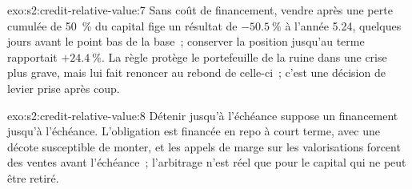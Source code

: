\begin{solution}{exo:s2:credit-relative-value:7}
Sans coût de financement, vendre après une perte cumulée de 50~\% du capital fige un résultat de $-50.5~\%$ à l'année 5.24, quelques jours avant le point bas de la base~; conserver la position jusqu'au terme
rapportait $+24.4~\%$. La règle protège le portefeuille de la ruine dans une crise plus grave, mais lui fait renoncer au rebond de celle-ci~; c'est une décision de levier prise après
coup.
\end{solution}

\begin{solution}{exo:s2:credit-relative-value:8}
Détenir jusqu'à l'échéance suppose un financement jusqu'à l'échéance. L'obligation est financée en repo à court terme, avec une décote susceptible de monter, et les appels de marge sur les valorisations
forcent des ventes avant l'échéance~; l'arbitrage n'est réel que pour le capital qui ne peut être retiré.
\end{solution}

